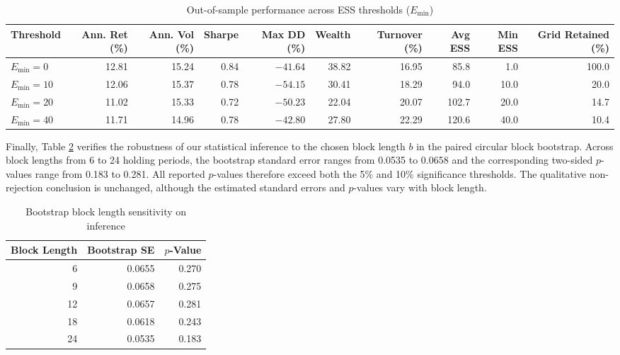 \documentclass[smallextended]{svjour3}
\begin{document}
\begin{table}[htbp]
\centering
\caption{Out-of-sample performance across ESS thresholds ($E_{\min}$)}
\label{tab:ess_backtest}
\begin{adjustbox}{max width=\textwidth}
\begin{tabular}{lrrrrrrrrr}
\toprule
\textbf{Threshold} & \textbf{Ann. Ret (\%)} & \textbf{Ann. Vol (\%)} & \textbf{Sharpe} & \textbf{Max DD (\%)} & \textbf{Wealth} & \textbf{Turnover (\%)} & \textbf{Avg ESS} & \textbf{Min ESS} & \textbf{Grid Retained (\%)} \\
\midrule
$E_{\min} = 0$ & 12.81 & 15.24 & 0.84 & $-41.64$ & 38.82 & 16.95 & 85.8 & 1.0 & 100.0 \\
$E_{\min} = 10$ & 12.06 & 15.37 & 0.78 & $-54.15$ & 30.41 & 18.29 & 94.0 & 10.0 & 20.0 \\
$E_{\min} = 20$ & 11.02 & 15.33 & 0.72 & $-50.23$ & 22.04 & 20.07 & 102.7 & 20.0 & 14.7 \\
$E_{\min} = 40$ & 11.71 & 14.96 & 0.78 & $-42.80$ & 27.80 & 22.29 & 120.6 & 40.0 & 10.4 \\
\bottomrule
\end{tabular}
\end{adjustbox}
\end{table}

Finally, Table \ref{tab:sens_block} verifies the robustness of our statistical inference to the chosen block length $b$ in the paired circular block bootstrap. Across block lengths from 6 to 24 holding periods, the bootstrap
standard error ranges from 0.0535 to 0.0658 and the corresponding
two-sided $p$-values range from 0.183 to 0.281. All reported $p$-values
therefore exceed both the 5\% and 10\% significance thresholds. The
qualitative non-rejection conclusion is unchanged, although the estimated
standard errors and $p$-values vary with block length.

\begin{table}[htbp]
\centering
\caption{Bootstrap block length sensitivity on inference}
\label{tab:sens_block}
\begin{tabular}{rrr}
\toprule
\textbf{Block Length} & \textbf{Bootstrap SE} & \textbf{$p$-Value} \\
\midrule
6 & 0.0655 & 0.270 \\
9 & 0.0658 & 0.275 \\
12 & 0.0657 & 0.281 \\
18 & 0.0618 & 0.243 \\
24 & 0.0535 & 0.183 \\

\bottomrule
\end{tabular}
\end{table}
\end{document}
